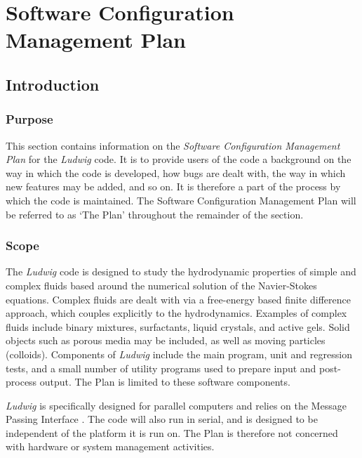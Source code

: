 \documentclass[11pt,twoside]{article}
\begin{document}
\setcounter{page}{1}

\tableofcontents

\newpage

\setcounter{page}{1}

\section{Software Configuration Management Plan}

\subsection{Introduction}

\subsubsection{Purpose}

This section contains information on the \textit{Software Configuration
Management Plan} for the \textit{Ludwig} code.
It is to provide users of the code a background on the way in which
the code is developed, how bugs are dealt with, the way in which
new features may be added, and so on. It is therefore a part
of the process by which the code is maintained. The Software Configuration
Management Plan will be referred to as `The Plan' throughout the remainder
of the section.

\subsubsection{Scope}

The \textit{Ludwig} code is designed to study the hydrodynamic properties
of simple and complex fluids based around the numerical solution of the
Navier-Stokes equations. Complex fluids are dealt with via a free-energy
based finite difference approach, which couples explicitly to the
hydrodynamics. Examples of complex fluids include binary mixtures,
surfactants, liquid crystals, and active gels. Solid objects such as
porous media may be included, as well as moving particles (colloids).
Components of \textit{Ludwig} include the main program, unit and
regression tests, and a small number of utility programs used to prepare
input and post-process output. The Plan is limited to these
software components.

\textit{Ludwig} is specifically designed for parallel computers and
relies on the Message Passing Interface \cite{mpi-standard}. The
code will also run in serial, and is designed to be independent of
the platform it is run on. The Plan is therefore not concerned with
hardware or system management activities.
\end{document}
